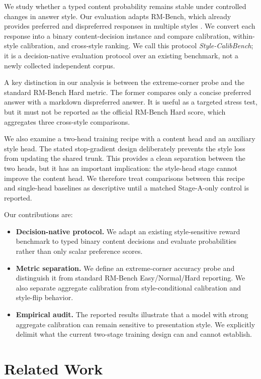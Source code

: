 \documentclass[letterpaper]{article} %
\begin{document}
We study whether a typed content probability remains stable under controlled changes in answer style. Our evaluation adapts RM-Bench, which already provides preferred and dispreferred responses in multiple styles \citep{liu2025rmbench}. We convert each response into a binary content-decision instance and compare calibration, within-style calibration, and cross-style ranking. We call this protocol \emph{Style-CalibBench}; it is a decision-native evaluation protocol over an existing benchmark, not a newly collected independent corpus.

A key distinction in our analysis is between the extreme-corner probe and the standard RM-Bench Hard metric. The former compares only a concise preferred answer with a markdown dispreferred answer. It is useful as a targeted stress test, but it must not be reported as the official RM-Bench Hard score, which aggregates three cross-style comparisons.

We also examine a two-head training recipe with a content head and an auxiliary style head. The stated stop-gradient design deliberately prevents the style loss from updating the shared trunk. This provides a clean separation between the two heads, but it has an important implication: the style-head stage cannot improve the content head. We therefore treat comparisons between this recipe and single-head baselines as descriptive until a matched Stage-A-only control is reported.

Our contributions are:
\begin{itemize}
    \item \textbf{Decision-native protocol.} We adapt an existing style-sensitive reward benchmark to typed binary content decisions and evaluate probabilities rather than only scalar preference scores.
    \item \textbf{Metric separation.} We define an extreme-corner accuracy probe and distinguish it from standard RM-Bench Easy/Normal/Hard reporting. We also separate aggregate calibration from style-conditional calibration and style-flip behavior.
    \item \textbf{Empirical audit.} The reported results illustrate that a model with strong aggregate calibration can remain sensitive to presentation style. We explicitly delimit what the current two-stage training design can and cannot establish.
\end{itemize}

\section{Related Work}
\end{document}
